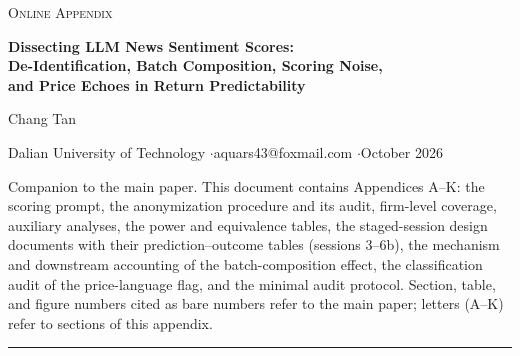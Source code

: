 \documentclass[11pt,a4paper]{article}
\theoremstyle{plain}
\theoremstyle{remark}
\begin{document}
\thispagestyle{plain}
\begin{center}
{\color{darkgray}\scshape Online Appendix}\par
\vspace{8pt}
{\LARGE\bfseries\color{black} Dissecting LLM News Sentiment Scores:}\\[4pt]
{\LARGE\bfseries\color{black} De-Identification, Batch Composition, Scoring Noise,}\\[4pt]
{\LARGE\bfseries\color{black} and Price Echoes in Return Predictability}\par
\vspace{10pt}
{\normalsize Chang Tan}\par
{\small\color{darkgray} Dalian University of Technology \quad$\cdot$\quad aquars43@foxmail.com \quad$\cdot$\quad October 2026}\par
\vspace{12pt}
{\small\color{darkgray} Companion to the main paper. This document contains Appendices A--K: the scoring prompt, the anonymization procedure and its audit, firm-level coverage, auxiliary analyses, the power and equivalence tables, the staged-session design documents with their prediction--outcome tables (sessions 3--6b), the mechanism and downstream accounting of the batch-composition effect, the classification audit of the price-language flag, and the minimal audit protocol. Section, table, and figure numbers cited as bare numbers refer to the main paper; letters (A--K) refer to sections of this appendix.}\par
\end{center}
\vspace{6pt}
\noindent\rule{\textwidth}{0.4pt}
\vspace{4pt}

\appendix



\end{document}
